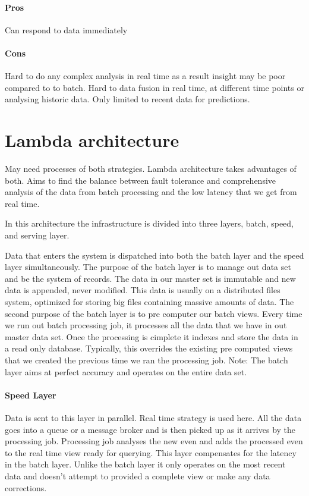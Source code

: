 \documentclass[a4paper, 11pt]{book}
\begin{document}
    \paragraph{Pros}
    Can respond to data immediately

    \paragraph{Cons}
    Hard to do any complex analysis in real time as a result insight may be poor compared to to batch.
    Hard to data fusion in real time, at different time points or analysing historic data. Only limited to recent data for predictions.


    \section{Lambda architecture}
    May need processes of both strategies.
    Lambda architecture takes advantages of both.
    Aims to find the balance between fault tolerance and comprehensive analysis of the data from batch processing and the low latency that we get from real time.

    In this architecture the infrastructure is divided into three layers, batch, speed, and serving layer.

    Data that enters the system is dispatched into both the batch layer and the speed layer simultaneously.
    The purpose of the batch layer is to manage out data set and be the system of records.
    The data in our master set is immutable and new data is appended, never modified.
    This data is usually on a distributed files system, optimized for storing big files containing massive amounts of data.
    The second purpose of the batch layer is to pre computer our batch views.
    Every time we run out batch processing job, it processes all the data that we have in out master data set.
    Once the processing is cimplete it indexes and store the data in a read only database.
    Typically, this overrides the existing pre computed views that we created the previous time we ran the processing job.
    Note: The batch layer aims at perfect accuracy and operates on the entire data set.

    \paragraph{Speed Layer}
    Data is sent to this layer in parallel.
    Real time strategy is used here.
    All the data goes into a queue or a message broker and is then picked up as it arrives by the processing job.
    Processing job analyses the new even and adds the processed even to the real time view ready for querying.
    This layer compensates for the latency in the batch layer.
    Unlike the batch layer it only operates on the most recent data and doesn't attempt to provided a complete view or make any data corrections.
\end{document}
